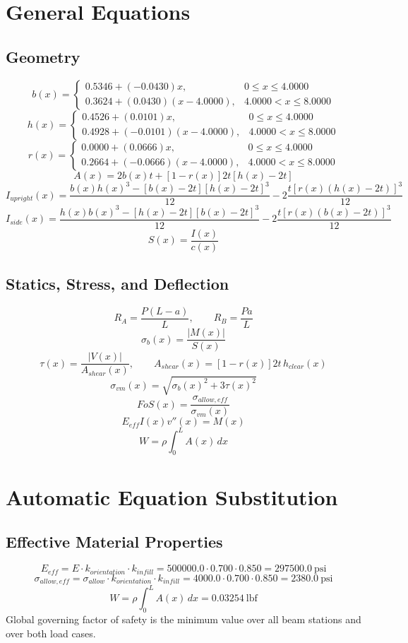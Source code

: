 \documentclass[11pt]{article}
\begin{document}
\section*{General Equations}
\subsection*{Geometry}
\[
b(x)=\begin{cases}0.5346 + (-0.0430)x, & 0 \le x \le 4.0000\\0.3624 + (0.0430)(x-4.0000), & 4.0000 < x \le 8.0000\end{cases}
\]
\[
h(x)=\begin{cases}0.4526 + (0.0101)x, & 0 \le x \le 4.0000\\0.4928 + (-0.0101)(x-4.0000), & 4.0000 < x \le 8.0000\end{cases}
\]
\[
r(x)=\begin{cases}0.0000 + (0.0666)x, & 0 \le x \le 4.0000\\0.2664 + (-0.0666)(x-4.0000), & 4.0000 < x \le 8.0000\end{cases}
\]
\[
A(x)=2b(x)t+[1-r(x)]2t[h(x)-2t]
\]
\[
I_{upright}(x)=\frac{b(x)h(x)^3-[b(x)-2t][h(x)-2t]^3}{12}-2\frac{t[r(x)(h(x)-2t)]^3}{12}
\]
\[
I_{side}(x)=\frac{h(x)b(x)^3-[h(x)-2t][b(x)-2t]^3}{12}-2\frac{t[r(x)(b(x)-2t)]^3}{12}
\]
\[
S(x)=\frac{I(x)}{c(x)}
\]

\subsection*{Statics, Stress, and Deflection}
\[
R_A=\frac{P(L-a)}{L}, \qquad R_B=\frac{Pa}{L}
\]
\[
\sigma_b(x)=\frac{|M(x)|}{S(x)}
\]
\[
\tau(x)=\frac{|V(x)|}{A_{shear}(x)}, \qquad A_{shear}(x)=[1-r(x)]2t\,h_{clear}(x)
\]
\[
\sigma_{vm}(x)=\sqrt{\sigma_b(x)^2+3\tau(x)^2}
\]
\[
FoS(x)=\frac{\sigma_{allow,eff}}{\sigma_{vm}(x)}
\]
\[
E_{eff}I(x)v''(x)=M(x)
\]
\[
W=\rho\int_0^L A(x)\,dx
\]

\section*{Automatic Equation Substitution}
\subsection*{Effective Material Properties}
\[E_{eff} = E \cdot k_{orientation} \cdot k_{infill} = 500000.0 \cdot 0.700 \cdot 0.850 = 297500.0\ \mathrm{psi}\]
\[\sigma_{allow,eff} = \sigma_{allow} \cdot k_{orientation} \cdot k_{infill} = 4000.0 \cdot 0.700 \cdot 0.850 = 2380.0\ \mathrm{psi}\]
\[W = \rho \int_0^L A(x)\,dx = 0.03254\ \mathrm{lbf}\]
Global governing factor of safety is the minimum value over all beam stations and over both load cases.
\end{document}
